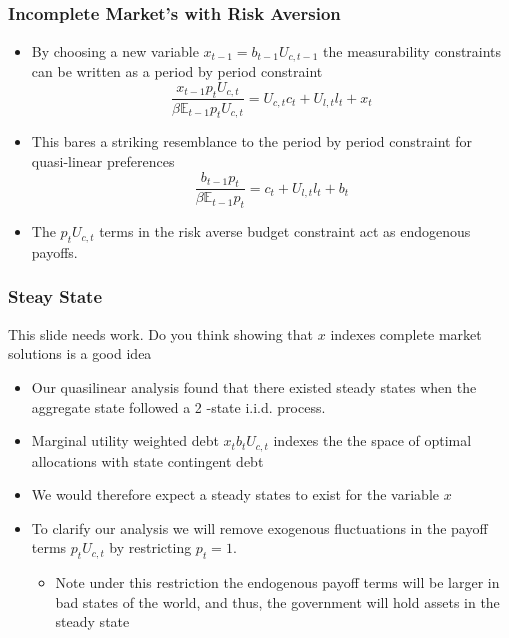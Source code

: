 \documentclass{beamer}
\newcommand{\EE}{\mathbb E}
\begin{document}
\subsection{}
\begin{frame}
	\frametitle{Incomplete Market's with Risk Aversion}
	\begin{itemize}
	\item By choosing a new variable $x_{t-1} = b_{t-1} U_{c,t-1}$ the measurability constraints can be written as a period by period constraint
	\[
		\frac{x_{t-1} p_t U_{c,t}}{\beta \EE_{t-1} p_t U_{c,t}}  = U_{c,t}c_t+U_{l,t} l_t + x_t
	\]
	\item  This bares a striking resemblance to the period by period constraint for quasi-linear preferences
	\[
		\frac{b_{t-1} p_t}{\beta \EE_{t-1} p_t} = c_t + U_{l,t} l_t + b_t
	\]
	\item  The $p_tU_{c,t}$ terms in the risk averse budget constraint act as endogenous payoffs.
	\end{itemize}
\end{frame}
 \begin{frame}
 	\frametitle{Steay State}
	{\color{red} This slide needs work.  Do you think showing that $x$ indexes complete market solutions is a good idea}
	\begin{itemize}
		\item Our quasilinear analysis found that there existed steady states when the aggregate state followed a 2 -state i.i.d. process.
		\item Marginal utility weighted debt $x_t b_t U_{c,t}$ indexes the the space of optimal allocations with state contingent debt
		\item  We would therefore expect a steady states to exist for the variable $x$
		\item  To clarify our analysis we will remove exogenous fluctuations in the payoff terms $p_t U_{c,t}$ by restricting $p_t =1$.
		\begin{itemize}
			\item  Note under this restriction the endogenous payoff terms will be larger in bad states of the world, and thus, the government will hold assets in the steady state
		\end{itemize}
	\end{itemize}
\end{frame}
\end{document}

